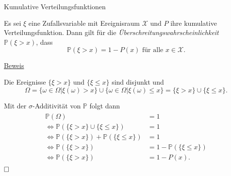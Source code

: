 \documentclass[
  8pt,
  ignorenonframetext,
]{beamer}
\begin{document}
\begin{frame}{Kumulative Verteilungsfunktionen}
\protect\hypertarget{kumulative-verteilungsfunktionen-1}{}
\small
\begin{theorem}[Überschreitungswahrscheinlichkeit]
\justifying
\normalfont
Es sei $\xi$ eine Zufallsvariable mit Ereignisraum $\mathcal{X}$ und $P$
ihre kumulative Verteilungsfunktion. Dann gilt für die \textit{Überschreitungswahrscheinlichkeit}
$\mathbb{P}(\xi > x)$, dass
\begin{equation}
\mathbb{P}(\xi > x) = 1 - P(x) \mbox{ für alle } x \in \mathcal{X}.
\end{equation}
\end{theorem}

\footnotesize

\underline{Beweis} \vspace{1mm}

Die Ereignisse \(\{\xi > x\}\) und \(\{\xi \le x\}\) sind disjunkt und
\begin{equation}
\Omega
= \{\omega\in \Omega| \xi(\omega) > x\} \cup \{\omega\in \Omega|\xi(\omega) \le x\}
= \{\xi > x\} \cup \{\xi \le x\}.
\end{equation}

Mit der \(\sigma\)-Additivität von \(\mathbb{P}\) folgt dann
\begin{align}
\begin{split}
\mathbb{P}(\Omega) & = 1                                \\
\Leftrightarrow
\mathbb{P}( \{\xi > x\} \cup \{\xi \le x\}) & = 1           \\
\Leftrightarrow
\mathbb{P}(\{\xi > x\}) + \mathbb{P}(\{\xi \le x\}) & = 1   \\
\Leftrightarrow
\mathbb{P}(\{\xi > x\}) &  =  1 -  \mathbb{P}(\{\xi \le x\}) \\
\Leftrightarrow
\mathbb{P}(\{\xi > x\}) &  =  1 -  P(x).
\end{split}
\end{align} \(\hfill \Box\)
\end{frame}
\end{document}
